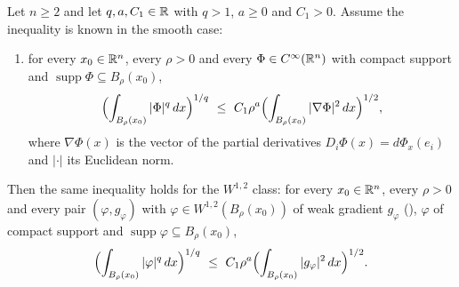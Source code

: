 \begin{helper}
Let $n\ge2$ and let $q,a,C_1\in\mathbb{R}$ with $q>1$, $a\ge0$ and $C_1>0$.  Assume the
inequality is known in the smooth case:
\begin{enumerate}
\item[(H)] for every $x_0\in\mathbb{R}^n$, every $\rho>0$ and every
  $\Phi\in C^\infty(\mathbb{R}^n)$ with compact support and
  $\operatorname{supp}\Phi\subseteq B_\rho(x_0)$,
  \[
  \Bigl(\int_{B_\rho(x_0)}|\Phi|^{q}\,dx\Bigr)^{1/q}
  \ \le\ C_1\rho^{a}
  \Bigl(\int_{B_\rho(x_0)}|\nabla\Phi|^2\,dx\Bigr)^{1/2},
  \]
  where $\nabla\Phi(x)$ is the vector of the partial derivatives
  $D_i\Phi(x)=d\Phi_x(e_i)$ and $|\cdot|$ its Euclidean norm.
\end{enumerate}
Then the same inequality holds for the $W^{1,2}$ class: for every
$x_0\in\mathbb{R}^n$, every $\rho>0$ and every pair $(\varphi,g_\varphi)$ with
$\varphi\in W^{1,2}(B_\rho(x_0))$ of weak gradient $g_\varphi$
(), $\varphi$ of compact support and
$\operatorname{supp}\varphi\subseteq B_\rho(x_0)$,
\[
\Bigl(\int_{B_\rho(x_0)}|\varphi|^{q}\,dx\Bigr)^{1/q}
\ \le\ C_1\rho^{a}
\Bigl(\int_{B_\rho(x_0)}|g_\varphi|^2\,dx\Bigr)^{1/2}.
\]
\end{helper}
